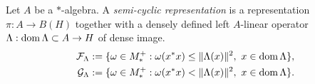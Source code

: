 \documentclass{../../large}
\begin{document}
\begin{prb}
Let $A$ be a $*$-algebra.
A \emph{semi-cyclic representation} is a representation $\pi:A\to B(H)$ together with a densely defined left $A$-linear operator $\Lambda:\operatorname{dom}\Lambda\subset A\to H$ of dense image.
\begin{align*}
\cF_\Lambda:=\{\omega\in M_*^+:\omega(x^*x)\le\|\Lambda(x)\|^2,\ x\in\dom\Lambda\},\\
\cG_\Lambda:=\{\omega\in M_*^+:\omega(x^*x)<\|\Lambda(x)\|^2,\ x\in\dom\Lambda\}.
\end{align*}
\begin{parts}
\item 
\end{parts}
\end{prb}
\end{document}

